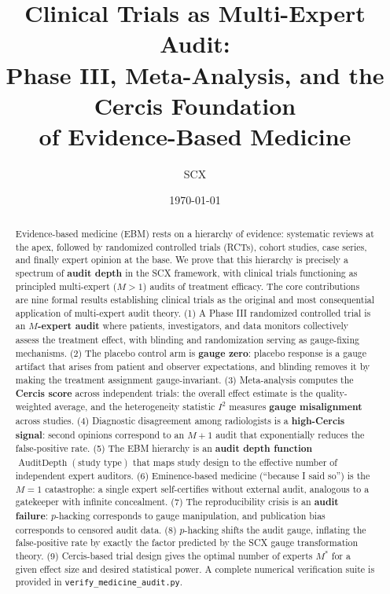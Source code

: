 \documentclass[12pt,a4paper]{article}
\title{\textbf{Clinical Trials as Multi-Expert Audit:\\
Phase III, Meta-Analysis, and the Cercis Foundation\\
of Evidence-Based Medicine}}
\author{SCX}
\date{\today}
\theoremstyle{remark}
\newcommand{\SCX}{\textsf{SCX}}
\DeclareMathOperator{\AuditDepth}{AuditDepth}
\begin{document}
\maketitle

\begin{abstract}
Evidence-based medicine (EBM) rests on a hierarchy of evidence: systematic
reviews at the apex, followed by randomized controlled trials (RCTs), cohort
studies, case series, and finally expert opinion at the base. We prove that
this hierarchy is precisely a spectrum of \textbf{audit depth} in the \SCX{}
framework, with clinical trials functioning as principled multi-expert
($M > 1$) audits of treatment efficacy. The core contributions are nine
formal results establishing clinical trials as the original and most
consequential application of multi-expert audit theory. (1) A Phase III
randomized controlled trial is an \textbf{$M$-expert audit} where patients,
investigators, and data monitors collectively assess the treatment effect,
with blinding and randomization serving as gauge-fixing mechanisms.
(2) The placebo control arm is \textbf{gauge zero}: placebo response is a
gauge artifact that arises from patient and observer expectations, and
blinding removes it by making the treatment assignment gauge-invariant.
(3) Meta-analysis computes the \textbf{Cercis score} across independent
trials: the overall effect estimate is the quality-weighted average, and
the heterogeneity statistic $I^2$ measures \textbf{gauge misalignment}
across studies. (4) Diagnostic disagreement among radiologists is a
\textbf{high-Cercis signal}: second opinions correspond to an $M+1$ audit
that exponentially reduces the false-positive rate. (5) The EBM hierarchy
is an \textbf{audit depth function} $\AuditDepth(\text{study type})$ that
maps study design to the effective number of independent expert auditors.
(6) Eminence-based medicine (``because I said so'') is the $M = 1$
catastrophe: a single expert self-certifies without external audit,
analogous to a gatekeeper with infinite concealment. (7) The reproducibility
crisis is an \textbf{audit failure}: $p$-hacking corresponds to gauge
manipulation, and publication bias corresponds to censored audit data.
(8) $p$-hacking shifts the audit gauge, inflating the false-positive rate
by exactly the factor predicted by the \SCX{} gauge transformation theory.
(9) Cercis-based trial design gives the optimal number of experts $M^*$
for a given effect size and desired statistical power. A complete numerical
verification suite is provided in \texttt{verify\_medicine\_audit.py}.
\end{abstract}
\end{document}
